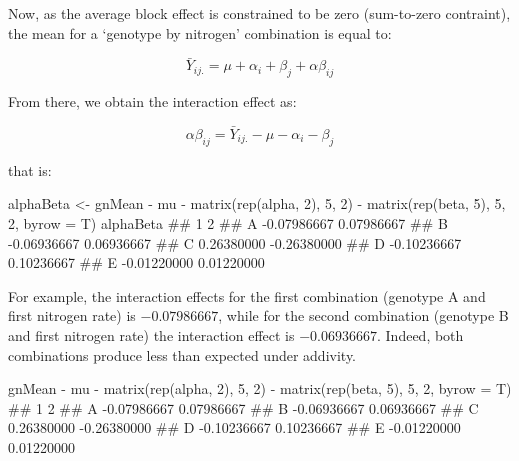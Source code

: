 \documentclass[a4paper,12pt,oneside]{book}
\newenvironment{Shaded}{\begin{snugshade}}{\end{snugshade}}
\newcommand{\DecValTok}[1]{#1}
\newcommand{\SpecialCharTok}[1]{#1}
\newcommand{\DocumentationTok}[1]{#1}
\newcommand{\OtherTok}[1]{#1}
\newcommand{\FunctionTok}[1]{#1}
\newcommand{\AttributeTok}[1]{#1}
\newcommand{\NormalTok}[1]{#1}
\begin{document}
Now, as the average block effect is constrained to be zero (sum-to-zero contraint), the mean for a `genotype by nitrogen' combination is equal to:

\[\bar{Y}_{ij.} = \mu + \alpha_i + \beta_j + \alpha\beta_{ij}\]

From there, we obtain the interaction effect as:

\[\alpha\beta_{ij} = \bar{Y}_{ij.} - \mu - \alpha_i - \beta_j\]

that is:

\vspace{12pt}

\begin{Shaded}
\begin{Highlighting}[]
\NormalTok{alphaBeta }\OtherTok{\textless{}{-}}\NormalTok{ gnMean }\SpecialCharTok{{-}}\NormalTok{ mu }\SpecialCharTok{{-}} \FunctionTok{matrix}\NormalTok{(}\FunctionTok{rep}\NormalTok{(alpha, }\DecValTok{2}\NormalTok{), }\DecValTok{5}\NormalTok{, }\DecValTok{2}\NormalTok{) }\SpecialCharTok{{-}} 
  \FunctionTok{matrix}\NormalTok{(}\FunctionTok{rep}\NormalTok{(beta, }\DecValTok{5}\NormalTok{), }\DecValTok{5}\NormalTok{, }\DecValTok{2}\NormalTok{, }\AttributeTok{byrow =}\NormalTok{ T)}
\NormalTok{alphaBeta}
\DocumentationTok{\#\#             1           2}
\DocumentationTok{\#\# A {-}0.07986667  0.07986667}
\DocumentationTok{\#\# B {-}0.06936667  0.06936667}
\DocumentationTok{\#\# C  0.26380000 {-}0.26380000}
\DocumentationTok{\#\# D {-}0.10236667  0.10236667}
\DocumentationTok{\#\# E {-}0.01220000  0.01220000}
\end{Highlighting}
\end{Shaded}

For example, the interaction effects for the first combination (genotype A and first nitrogen rate) is \(-0.07986667\), while for the second combination (genotype B and first nitrogen rate) the interaction effect is \(-0.06936667\). Indeed, both combinations produce less than expected under addivity.

\vspace{12pt}

\begin{Shaded}
\begin{Highlighting}[]
\NormalTok{gnMean }\SpecialCharTok{{-}}\NormalTok{ mu }\SpecialCharTok{{-}} \FunctionTok{matrix}\NormalTok{(}\FunctionTok{rep}\NormalTok{(alpha, }\DecValTok{2}\NormalTok{), }\DecValTok{5}\NormalTok{, }\DecValTok{2}\NormalTok{) }\SpecialCharTok{{-}} 
  \FunctionTok{matrix}\NormalTok{(}\FunctionTok{rep}\NormalTok{(beta, }\DecValTok{5}\NormalTok{), }\DecValTok{5}\NormalTok{, }\DecValTok{2}\NormalTok{, }\AttributeTok{byrow =}\NormalTok{ T)}
\DocumentationTok{\#\#             1           2}
\DocumentationTok{\#\# A {-}0.07986667  0.07986667}
\DocumentationTok{\#\# B {-}0.06936667  0.06936667}
\DocumentationTok{\#\# C  0.26380000 {-}0.26380000}
\DocumentationTok{\#\# D {-}0.10236667  0.10236667}
\DocumentationTok{\#\# E {-}0.01220000  0.01220000}
\end{Highlighting}
\end{Shaded}
\end{document}
